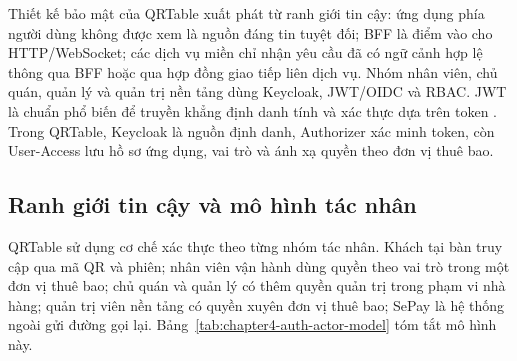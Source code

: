 Thiết kế bảo mật của QRTable xuất phát từ ranh giới tin cậy: ứng dụng phía người dùng không được xem là nguồn đáng tin tuyệt đối; BFF là điểm vào cho HTTP/WebSocket; các dịch vụ miền chỉ nhận yêu cầu đã có ngữ cảnh hợp lệ thông qua BFF hoặc qua hợp đồng giao tiếp liên dịch vụ. Nhóm nhân viên, chủ quán, quản lý và quản trị nền tảng dùng Keycloak, JWT/OIDC và RBAC. JWT là chuẩn phổ biến để truyền khẳng định danh tính và xác thực dựa trên token \cite{jones-jwt-rfc7519-2015}. Trong QRTable, Keycloak là nguồn định danh, Authorizer xác minh token, còn User-Access lưu hồ sơ ứng dụng, vai trò và ánh xạ quyền theo đơn vị thuê bao.

\subsection{Ranh giới tin cậy và mô hình tác nhân}

QRTable sử dụng cơ chế xác thực theo từng nhóm tác nhân. Khách tại bàn truy cập qua mã QR và phiên; nhân viên vận hành dùng quyền theo vai trò trong một đơn vị thuê bao; chủ quán và quản lý có thêm quyền quản trị trong phạm vi nhà hàng; quản trị viên nền tảng có quyền xuyên đơn vị thuê bao; SePay là hệ thống ngoài gửi đường gọi lại. Bảng~\ref{tab:chapter4-auth-actor-model} tóm tắt mô hình này.

